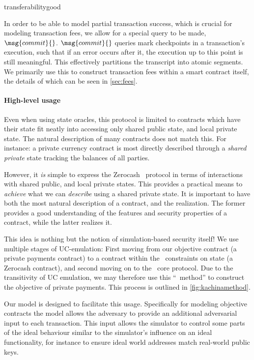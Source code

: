 {transferabilitygood}

In order to be able to model partial transaction success, which
is crucial for modeling transaction fees, we allow for a special query to
be made, $\msg{commit}{}$. $\msg{commit}{}$ queries mark checkpoints in a
transaction's execution, such that if an error occurs after it, the execution up
to this point is still meaningful. This effectively partitions the transcript
into atomic segments. We primarily use this to construct
transaction fees within a smart contract itself, the details of which can be
seen in \iffull\autoref{sec:fees}\else\cite[Appendix~J.5]{fullversion}\fi.

\paragraph{High-level usage}

Even when using state oracles, this protocol is limited to contracts which have
their state fit neatly into accessing only shared public state, and local
private state. The natural description of many contracts does not match this.
For instance: a private currency contract is most directly described through
a \emph{shared private} state tracking the balances of all parties.

However, it \emph{is} simple to express the Zerocash~\cite{SP:BCGGMT14} protocol in terms of
interactions with shared public, and local private states. This provides a
practical means to \emph{achieve} what we can \emph{describe} using a shared
private state. It is important to have both the most natural description of a
contract, and the realization. The former provides a good understanding of
the features and security properties of a contract, while the latter
realizes it.

This idea is nothing but the notion of simulation-based security itself! We use
multiple stages of UC-emulation: First moving from our objective
contract (a private payments contract) to a contract within the \kachina\
constraints on state (a Zerocash contract), and second moving on to the
\kachina\ core protocol. Due to the transitivity of UC emulation, we may therefore
use this ``\kachina\ method'' to construct the objective of private payments. This
process is outlined in \autoref{fig:kachinamethod}.

Our model is designed to facilitate this usage. Specifically for
modeling objective contracts the model allows the adversary to provide an
additional adversarial input to each transaction. This input allows the
simulator to control some parts of the ideal behaviour similar to the simulator's
influence on an ideal functionality, for instance to ensure
ideal world addresses match real-world public keys.


